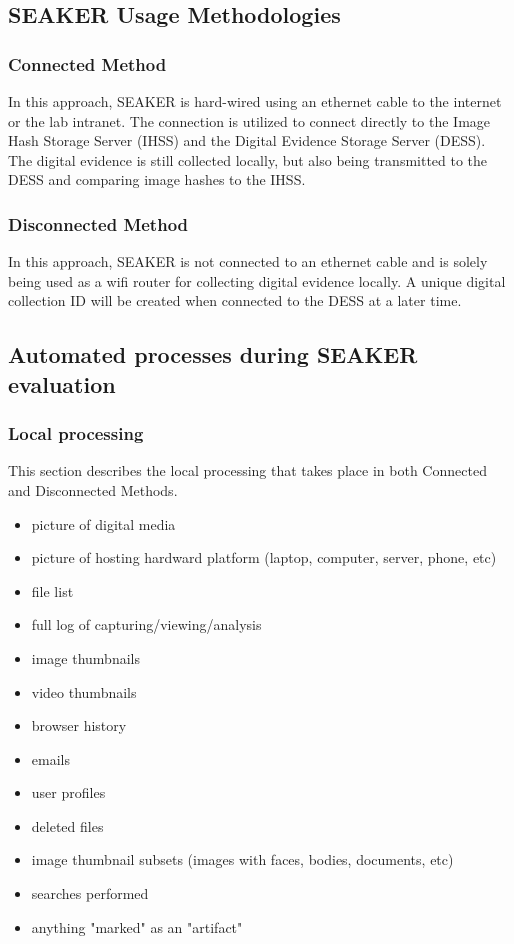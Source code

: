 \documentclass[12pt]{article}
\begin{document}
\subsection{SEAKER Usage Methodologies}
\subsubsection{Connected Method}

In this approach, SEAKER is hard-wired using an ethernet cable to the internet or the lab intranet.  The connection
is utilized to connect directly to the Image Hash Storage Server (IHSS) and the Digital Evidence Storage Server (DESS).
The digital evidence is still collected locally, but also being transmitted to the DESS and comparing image hashes
to the IHSS.\\

\subsubsection{Disconnected Method}

In this approach, SEAKER is not connected to an ethernet cable and is solely being used as a wifi router for
collecting digital evidence locally.  A unique digital collection ID will be created when connected to the DESS
at a later time.

\subsection{Automated processes during SEAKER evaluation}

\subsubsection{Local processing}

This section describes the local processing that takes place in both Connected and Disconnected Methods.
\begin{itemize}
  \item picture of digital media
  \item picture of hosting hardward platform (laptop, computer, server, phone, etc)
  \item file list
  \item full log of capturing/viewing/analysis
  \item image thumbnails
  \item video thumbnails
  \item browser history
  \item emails
  \item user profiles
  \item deleted files
  \item image thumbnail subsets (images with faces, bodies, documents, etc)
  \item searches performed
  \item anything "marked" as an "artifact"
\end{itemize}
\end{document}
